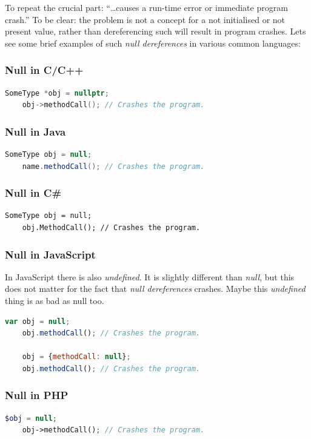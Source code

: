 \documentclass[11pt, a4paper]{report}
\begin{document}
To repeat the crucial part: ``\dots causes a run-time error or immediate program crash.'' To be clear: the problem is not a concept for a not initialised or not present value, rather than dereferencing such will result in program crashes. Lets see some brief examples of such \textit{null dereferences} in various common languages:

\subsubsection{Null in C/C++}
\begin{lstlisting}[language=C++]
    SomeType *obj = nullptr;
    obj->methodCall(); // Crashes the program.
\end{lstlisting}

\subsubsection{Null in Java}
\begin{lstlisting}[language=Java]
    SomeType obj = null;
    name.methodCall(); // Crashes the program.
\end{lstlisting}

\subsubsection{Null in C\#}
\begin{lstlisting}[language={[Sharp]C}]
    SomeType obj = null;
    obj.MethodCall(); // Crashes the program.
\end{lstlisting}

\subsubsection{Null in JavaScript}
In JavaScript there is also \textit{undefined}. It is slightly different than \textit{null}, but this does not matter for the fact that \textit{null dereferences} crashes. Maybe this \textit{undefined} thing is as bad as null too.

\begin{lstlisting}[language=JavaScript]
    var obj = null;
    obj.methodCall(); // Crashes the program.

    obj = {methodCall: null};
    obj.methodCall(); // Crashes the program.
\end{lstlisting}

\subsubsection{Null in PHP}
\begin{lstlisting}[language=PHP]
    $obj = null;
    obj->methodCall(); // Crashes the program.
\end{lstlisting}
\end{document}
